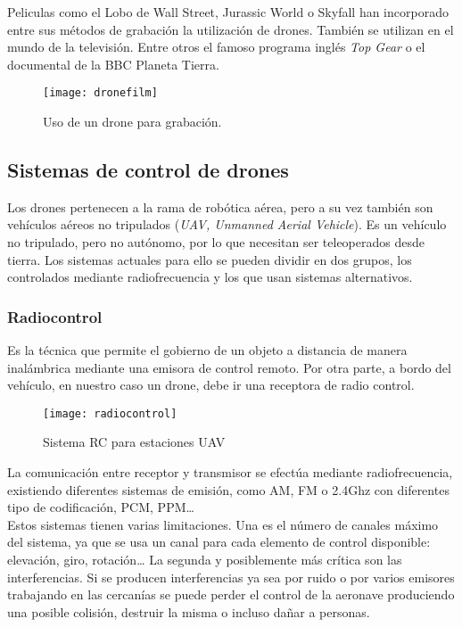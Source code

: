 Peliculas como el Lobo de Wall Street, Jurassic World o Skyfall han incorporado entre sus métodos de grabación la utilización de drones. También se utilizan en el mundo de la televisión. Entre otros el famoso programa inglés \emph{Top Gear} o el documental de la BBC Planeta Tierra.

\begin{figure}[htb]
\centering
\texttt{[image: dronefilm]}
\caption{Uso de un drone para grabación.}
\label{fig:amazon}
\end{figure}



\subsection{Sistemas de control de drones}
\label{cap:controldrones}

Los drones pertenecen a la rama de robótica aérea, pero a su vez también son vehículos aéreos no tripulados (\emph{UAV, Unmanned  Aerial Vehicle}). Es un vehículo no tripulado, pero no autónomo, por lo que necesitan ser teleoperados desde tierra. Los sistemas actuales para ello se pueden dividir en dos grupos, los controlados mediante radiofrecuencia y los que usan sistemas alternativos.\\

\subsubsection{Radiocontrol}

Es la técnica que permite el gobierno de un objeto a distancia de manera inalámbrica mediante una emisora de control remoto. Por otra parte, a bordo del vehículo, en nuestro caso un drone, debe ir una receptora de radio control. \\

\begin{figure}[htb]
\centering
\texttt{[image: radiocontrol]}
\caption{Sistema RC para estaciones UAV}
\label{fig:radiocontrol}
\end{figure}


La comunicación entre receptor y transmisor se efectúa mediante radiofrecuencia, existiendo diferentes sistemas de emisión, como AM, FM o 2.4Ghz con diferentes tipo de codificación, PCM, PPM…\\

Estos sistemas tienen varias limitaciones. Una es el número de canales máximo del sistema, ya que se usa un canal para cada elemento de control disponible: elevación, giro, rotación… La segunda y posiblemente más crítica son las interferencias. Si se producen interferencias ya sea por ruido o por varios emisores trabajando en las cercanías se puede perder el control de la aeronave produciendo una posible colisión, destruir la misma o incluso dañar a personas.\\
 
